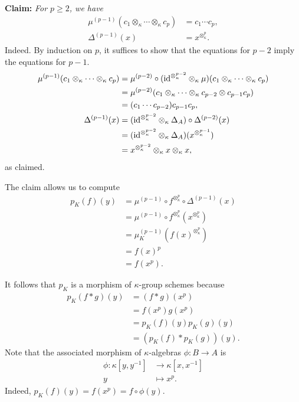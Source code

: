 \textbf{Claim:} \textit{For\/ $p\ge2$, we have}
    \begin{align*}
        \mu^{(p-1)}(c_1\otimes_\kappa\cdots\otimes_\kappa c_p)
            &= c_1\cdots c_p,\\
        \Delta^{(p-1)}(x) &=x^{\otimes_\kappa^p}.
    \end{align*}
\small
Indeed. By induction on $p$, it suffices to show that the equations for $p-2$ imply the equations for $p-1$.
\begin{align*}
    \mu^{(p-1)}(c_1\otimes_\kappa\cdots\otimes_\kappa c_p)
        &= \mu^{(p-2)}
            \circ(\text{\rm id}^{\otimes_\kappa^{p-2}}\otimes_\kappa\mu)
            (c_1\otimes_\kappa\cdots\otimes_\kappa c_p)\\
        &= \mu^{(p-2)}
            (c_1\otimes_\kappa\cdots\otimes_\kappa c_{p-2}
                \otimes c_{p-1}c_p)\\
        &= (c_1\cdots c_{p-2})c_{p-1}c_p,\\
    \Delta^{(p-1)}(x)
        &= (\text{\rm id}^{\otimes_\kappa^{p-2}}\otimes_\kappa\Delta_A)
            \circ\Delta^{(p-2)}(x)\\
        &= (\text{\rm id}^{\otimes_\kappa^{p-2}}\otimes_\kappa\Delta_A)
            (x^{\otimes_\kappa^{p-1}})\\
        &= x^{\otimes_\kappa^{p-2}}\otimes_\kappa x\otimes_\kappa x,
\end{align*}
as claimed.
\normalsize

The claim allows us to compute
\begin{align*}
    p_K(f)(y)
        &= \mu^{(p-1)}
            \circ f^{\otimes_\kappa^p}
            \circ\Delta^{(p-1)}(x)\\
        &= \mu^{(p-1)}
            \circ f^{\otimes_\kappa^p}
            (x^{\otimes_\kappa^p})\\
        &= \mu_K^{(p-1)}(f(x)^{\otimes_\kappa^p})\\
        &= f(x)^p\\
        &= f(x^p).
\end{align*}

It follows that $p_K$ is a morphism of $\kappa$-group schemes because
\begin{align*}
    p_K(f*g)(y) &= (f*g)(x^p)\\
        &= f(x^p)g(x^p)\\
        &= p_K(f)(y)p_K(g)(y)\\
        &= (p_K(f)*p_K(g))(y).
\end{align*}
Note that the associated morphism of $\kappa$-algebras $\phi\colon B\to A$ is
\begin{align*}
    \phi\colon\kappa[y,y^{-1}]&\to\kappa[x,x^{-1}]\\
        y &\mapsto x^p.
\end{align*}
Indeed, $p_K(f)(y) = f(x^p) = f\circ\phi(y)$.

